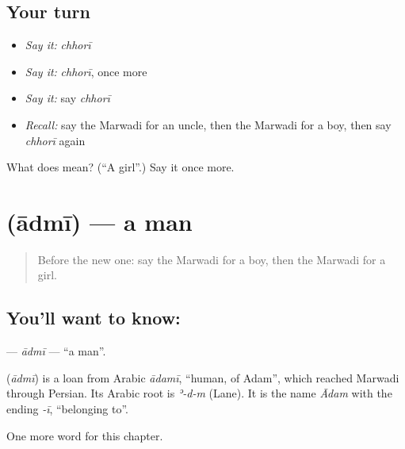 \subsection*{Your turn}
\begin{itemize}
\raggedright
  \item \emph{Say it:} \emph{chhorī}
  \item \emph{Say it:} \emph{chhorī}, once more
  \item \emph{Say it:} say \emph{chhorī}
  \item \emph{Recall:} say the Marwadi for an uncle, then the Marwadi for a boy, then say \emph{chhorī} again
\end{itemize}

\begin{tcolorbox}[breakable,colback=teal!4,colframe=teal!35!black,title={Before you move on}]
What does  mean? (\textquotedblleft{}A girl\textquotedblright{}.) Say it once more.
\end{tcolorbox}
\section[\texorpdfstring{\mw{आदमी} (ādmī)}{आदमी (ādmī)}]{ (ādmī) — a man}

\label{lesson:MW-C49-admi}



\begin{quote}
Before the new one: say the Marwadi for a boy, then the Marwadi for a girl.
\end{quote}

\subsection*{You'll want to know: }
\textbf{} — \emph{ādmī} — \textquotedblleft{}a man\textquotedblright{}.

\begin{cousinweb}
\textbf{} (\emph{ādmī}) is a loan from Arabic \emph{ādamī}, \textquotedblleft{}human, of Adam\textquotedblright{}, which reached Marwadi through Persian. Its Arabic root is \emph{ʾ-d-m} (Lane). It is the name \emph{Ādam} with the ending \emph{-ī}, \textquotedblleft{}belonging to\textquotedblright{}.
\end{cousinweb}

\begin{grammarlens}[title={What you've built}]
One more word for this chapter.
\end{grammarlens}

